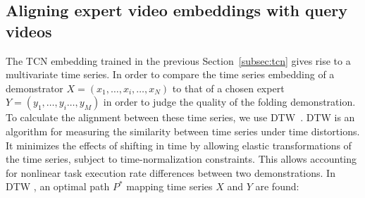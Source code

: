 \documentclass[\home/main.tex]{subfiles}
\begin{document}
\subsection{Aligning expert video embeddings with query videos} \label{subsec:dtw}


The TCN embedding trained in the previous Section~\ref{subsec:tcn} gives rise to a multivariate time series. In order to compare the time series embedding of a demonstrator $X = (x_1, \ldots, x_i, \ldots, x_N)$ to that of a chosen expert $Y = (y_1, \ldots, y_i \ldots, y_M)$ in order to judge the quality of the folding demonstration. To calculate the alignment between these time series, we use \acrfull{DTW}~\cite{Bellman1959}. \acrshort{DTW} is an algorithm for measuring the similarity between time series under time distortions. It minimizes the effects of shifting in time by allowing elastic transformations of the time series, subject to time-normalization constraints. This allows accounting for nonlinear task execution rate differences between two demonstrations. In \acrshort{DTW} , an optimal path $P^*$ mapping time series $X$ and $Y$ are found:

\end{document}
